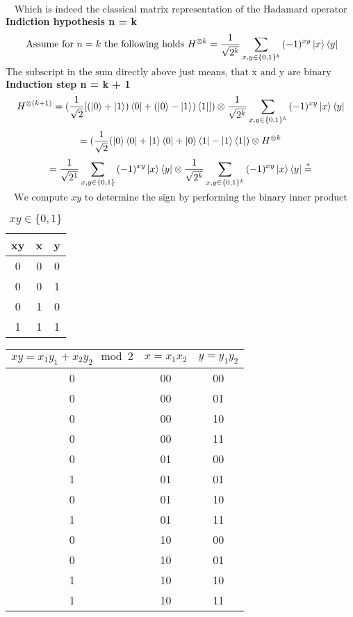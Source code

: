 \documentclass{article}
\begin{document}
\begin{framed}
$$    $$
    $$
    \text{Which is indeed the classical matrix representation of the Hadamard operator}
    $$
    \textbf{Indiction hypothesis n = k}
    $$
    \text{ Assume for } n = k \text{ the following holds } H^{\otimes k} = \frac{1}{\sqrt{2^k}}\sum_{x,y\in \{0,1\}^k}{(-1)^{xy}\ket{x}\bra{y}}
    $$
    $$
    \text{The subscript in the sum directly above just means, that x and y are binary strings of length k}
    $$
    \textbf{Induction step n = k + 1}
    $$
    H^{\otimes (k+1)} = (\frac{1}{\sqrt{2}}[(\ket{0}+\ket{1})\bra{0} + (\ket{0}-\ket{1})\bra{1}]) \otimes \frac{1}{\sqrt{2^k}}\sum_{x,y\in \{0,1\}^k}{(-1)^{xy}\ket{x}\bra{y}}
    $$
    $$
    = (\frac{1}{\sqrt{2}}(\ket{0}\bra{0} + \ket{1}\bra{0} + \ket{0}\bra{1} - \ket{1}\bra{1}) \otimes H^{\otimes k}
    $$
    $$
    = \frac{1}{\sqrt{2^1}}\sum_{x,y \in \{0, 1\}}{(-1)^{xy}\ket{x}\bra{y}} \otimes \frac{1}{\sqrt{2^k}}\sum_{x,y\in \{0,1\}^k}{(-1)^{xy}\ket{x}\bra{y}} \overset{*}{=}
    $$
    $$
    \text{We compute } xy \text{ to determine the sign by performing the binary inner product} 
    $$
\begin{table}[H] 
    \centering
    \begin{tabular}{|c|c|c|}
        \hline
        xy & x & y \\ 
        \hline
        0 & 0 & 0 \\
        0 & 0 & 1 \\
        0 & 1 & 0 \\
        1 & 1 & 1 \\
        \hline
    \end{tabular}
    \caption{$xy \in \{0,1\}$}
    \label{tab:binary_inner_product}
\end{table}
\begin{table}[H] 
    \centering
    \begin{tabular}{|c|c|c|}
        \hline
        $xy = x_1y_1 + x_2y_2 \mod 2$ & $x=x_1x_2$ & $y=y_1y_2$ \\ 
        \hline
        0 & 00 & 00 \\ 0 & 00 & 01 \\ 0 & 00 & 10 \\ 0 & 00 & 11 \\ 
        0 & 01 & 00 \\ 1 & 01 & 01 \\ 0 & 01 & 10 \\ 1 & 01 & 11 \\ 
        0 & 10 & 00 \\ 0 & 10 & 01 \\ 1 & 10 & 10 \\ 1 & 10 & 11 \\ 

\end{tabular}
\end{table}
\end{framed}
\end{document}
